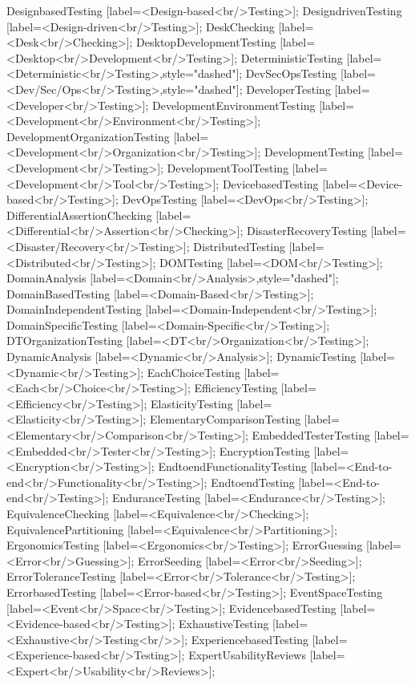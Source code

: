 \documentclass{article}
\begin{document}
{DesignbasedTesting [label=<Design-based<br/>Testing>];
DesigndrivenTesting [label=<Design-driven<br/>Testing>];
DeskChecking [label=<Desk<br/>Checking>];
DesktopDevelopmentTesting [label=<Desktop<br/>Development<br/>Testing>];
DeterministicTesting [label=<Deterministic<br/>Testing>,style="dashed"];
DevSecOpsTesting [label=<Dev/Sec/Ops<br/>Testing>,style="dashed"];
DeveloperTesting [label=<Developer<br/>Testing>];
DevelopmentEnvironmentTesting [label=<Development<br/>Environment<br/>Testing>];
DevelopmentOrganizationTesting [label=<Development<br/>Organization<br/>Testing>];
DevelopmentTesting [label=<Development<br/>Testing>];
DevelopmentToolTesting [label=<Development<br/>Tool<br/>Testing>];
DevicebasedTesting [label=<Device-based<br/>Testing>];
DevOpsTesting [label=<DevOps<br/>Testing>];
DifferentialAssertionChecking [label=<Differential<br/>Assertion<br/>Checking>];
DisasterRecoveryTesting [label=<Disaster/Recovery<br/>Testing>];
DistributedTesting [label=<Distributed<br/>Testing>];
DOMTesting [label=<DOM<br/>Testing>];
DomainAnalysis [label=<Domain<br/>Analysis>,style="dashed"];
DomainBasedTesting [label=<Domain-Based<br/>Testing>];
DomainIndependentTesting [label=<Domain-Independent<br/>Testing>];
DomainSpecificTesting [label=<Domain-Specific<br/>Testing>];
DTOrganizationTesting [label=<DT<br/>Organization<br/>Testing>];
DynamicAnalysis [label=<Dynamic<br/>Analysis>];
DynamicTesting [label=<Dynamic<br/>Testing>];
EachChoiceTesting [label=<Each<br/>Choice<br/>Testing>];
EfficiencyTesting [label=<Efficiency<br/>Testing>];
ElasticityTesting [label=<Elasticity<br/>Testing>];
ElementaryComparisonTesting [label=<Elementary<br/>Comparison<br/>Testing>];
EmbeddedTesterTesting [label=<Embedded<br/>Tester<br/>Testing>];
EncryptionTesting [label=<Encryption<br/>Testing>];
EndtoendFunctionalityTesting [label=<End-to-end<br/>Functionality<br/>Testing>];
EndtoendTesting [label=<End-to-end<br/>Testing>];
EnduranceTesting [label=<Endurance<br/>Testing>];
EquivalenceChecking [label=<Equivalence<br/>Checking>];
EquivalencePartitioning [label=<Equivalence<br/>Partitioning>];
ErgonomicsTesting [label=<Ergonomics<br/>Testing>];
ErrorGuessing [label=<Error<br/>Guessing>];
ErrorSeeding [label=<Error<br/>Seeding>];
ErrorToleranceTesting [label=<Error<br/>Tolerance<br/>Testing>];
ErrorbasedTesting [label=<Error-based<br/>Testing>];
EventSpaceTesting [label=<Event<br/>Space<br/>Testing>];
EvidencebasedTesting [label=<Evidence-based<br/>Testing>];
ExhaustiveTesting [label=<Exhaustive<br/>Testing<br/>>];
ExperiencebasedTesting [label=<Experience-based<br/>Testing>];
ExpertUsabilityReviews [label=<Expert<br/>Usability<br/>Reviews>];
}
\end{document}
